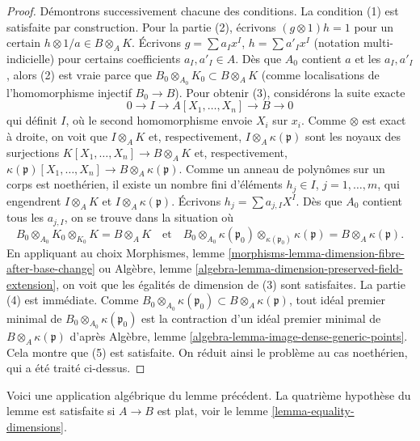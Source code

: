 \begin{proof}
\medskip\noindent
Démontrons successivement chacune des conditions. La condition (1) est satisfaite par construction.
Pour la partie (2), écrivons $(g \otimes 1) h = 1$ pour un certain
$h \otimes 1/a \in B \otimes_A K$. Écrivons
$g = \sum a_I x^I$, $h = \sum a'_I x^I$ (notation multi-indicielle)
pour certains coefficients $a_I, a'_I \in A$. Dès que $A_0$ contient
$a$ et les $a_I, a'_I$, alors (2) est vraie parce que
$B_0 \otimes_{A_0} K_0 \subset B \otimes_A K$ (comme localisations de
l'homomorphisme injectif $B_0 \to B$).
Pour obtenir (3), considérons la suite exacte
$$
0 \to I \to A[X_1, \ldots, X_n] \to B \to 0
$$
qui définit $I$, où le second homomorphisme envoie $X_i$ sur $x_i$. Comme $\otimes$
est exact à droite, on voit que $I \otimes_A K$ et, respectivement,
$I \otimes_A \kappa(\mathfrak p)$ sont les noyaux des surjections
$K[X_1, \ldots, X_n] \to B \otimes_A K$ et, respectivement,
$\kappa(\mathfrak p)[X_1, \ldots, X_n] \to B \otimes_A \kappa(\mathfrak p)$.
Comme un anneau de polynômes sur un corps est noethérien,
il existe un nombre fini d'éléments $h_j \in I$, $j = 1, \ldots, m$,
qui engendrent $I \otimes_A K$ et $I \otimes_A \kappa(\mathfrak p)$.
Écrivons $h_j = \sum a_{j, I}X^I$. Dès que
$A_0$ contient tous les $a_{j, I}$, on se trouve dans la situation où
$$
B_0 \otimes_{A_0} K_0 \otimes_{K_0} K = B \otimes_A K
\quad\text{et}\quad
B_0 \otimes_{A_0} \kappa(\mathfrak p_0)
\otimes_{\kappa(\mathfrak p_0)} \kappa(\mathfrak p)
=
B \otimes_A \kappa(\mathfrak p).
$$
En appliquant au choix
Morphismes, lemme \ref{morphisms-lemma-dimension-fibre-after-base-change}
ou
Algèbre, lemme \ref{algebra-lemma-dimension-preserved-field-extension},
on voit que les égalités de dimension de (3) sont satisfaites.
La partie (4) est immédiate. Comme
$B_0 \otimes_{A_0} \kappa(\mathfrak p_0) \subset
B \otimes_A \kappa(\mathfrak p)$, tout idéal premier minimal de
$B_0 \otimes_{A_0} \kappa(\mathfrak p_0)$ est la contraction d'un idéal
premier minimal de $B \otimes_A \kappa(\mathfrak p)$ d'après
Algèbre, lemme \ref{algebra-lemma-image-dense-generic-points}.
Cela montre que (5) est satisfaite.
On réduit ainsi le problème au cas noethérien, qui a été
traité ci-dessus.
\end{proof}

\noindent
Voici une application algébrique du lemme précédent.
La quatrième hypothèse du lemme est satisfaite si $A \to B$ est plat, voir
le lemme \ref{lemma-equality-dimensions}.

